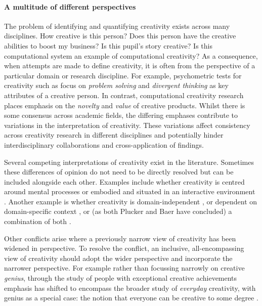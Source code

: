 \documentclass[10pt,letterpaper]{article}
\begin{document}
\paragraph{A multitude of different perspectives} \label{perspectives}

The problem of identifying and quantifying creativity exists across many disciplines. How creative is this person? Does this person have the creative abilities to boost my business? Is this pupil's story creative? Is this computational system an example of computational creativity? As a consequence, when attempts are made to define creativity, it is often from the perspective of a particular domain or research discipline. For example, psychometric tests for creativity such as \cite{guilford50,torrance74} focus on {\em problem solving} and {\em divergent thinking} as key attributes of a creative person. In contrast, computational creativity research \cite[for example]{pease01,wiggins06ngc,peinado06ngc,ritchie07} places emphasis on the {\em novelty} and {\em value} of creative products. Whilst there is some consensus across academic fields, the differing emphases contribute to variations in the interpretation of creativity. These variations affect consistency across creativity research in different disciplines and potentially hinder interdisciplinary collaborations and cross-application of findings.

Several competing interpretations of creativity exist in the literature. Sometimes these differences of opinion do not need to be directly resolved but can be included alongside each other. Examples include whether creativity is centred around mental processes \cite{boden04,dietrich10} or embodied and situated in an interactive environment \cite{mccormack07,sosa09}. Another example is whether creativity is domain-independent \cite{plucker98}, or dependent on domain-specific context \cite{baer98}, or (as both Plucker and Baer have concluded) a combination of both \cite{plucker04,baer10}. 

Other conflicts arise where a previously narrow view of creativity has been widened in perspective. To resolve the conflict, an inclusive, all-encompassing view of creativity should adopt the wider perspective and incorporate the narrower perspective. For example rather than focussing narrowly on creative {\em genius}, through the study of people with exceptional creative achievements \cite[for example]{poincare29,hadamard45} emphasis has shifted to encompass the broader study of {\em everyday} creativity, with genius as a special case: the notion that everyone can be creative to some degree \cite{weisberg88,bryankinns09}.
\end{document}
